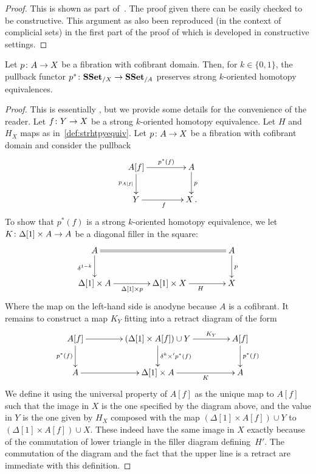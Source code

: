 \documentclass[reqno,10pt,a4paper,oneside,draft]{amsart}
\begin{document}
\begin{proof}
This is shown as part of~\cite[Theorem 3.2.3]{joyal-tierney:simplicial-homotopy-theory}. The proof given there can be easily checked to be constructive. This argument as also been reproduced (in the context of complicial sets) in the first part of the proof of \cite[Proposition~5.2.6]{henry2018wms} which is developed in constructive settings.
\end{proof}




\begin{lemma} 
\label{lemma:pb_of_StrongHomotopyEq}
Let $p \colon A \rightarrow X$ be a fibration with cofibrant domain. Then, for $k \in \{0,1\}$, 
the pullback functor $p^* \colon \mathbf{SSet}_{/X} \to \mathbf{SSet}_{/A}$ preserves strong $k$-oriented homotopy equivalences.
\end{lemma}



\begin{proof} This is essentially \cite[Lemma~3.7]{gambino2017frobenius}, but we provide some details
for the convenience of the reader.
Let $f \colon Y \rightarrow X$ be a strong $k$-oriented homotopy equivalence. Let $H$ and $H_X$  maps 
as in~\cref{def:strhtpyequiv}. Let $p \colon A \rightarrow X$ be a fibration with cofibrant domain and consider the pullback
\[
\xymatrix@C=1.5cm{
A[f] \ar[r]^-{p^*(f)}  \ar[d]_{p_{A[f]}} & A \ar[d]^{p} \\
Y \ar[r]_{f} & X \, .\\
}
\] 
To show that $p^*(f)$ is a strong $k$-oriented homotopy equivalence, we let $K \colon \Delta[1] \times A \rightarrow A$ be a diagonal filler in the square:
\[
\xymatrix@C=1.5cm{
A \ar[d]_{\delta^{1-k}} \ar@{=}[rr] & & A \ar[d]^p \\ 
\Delta[1] \times A \ar[r]_{\Delta[1] \times p}  & \Delta[1] \times X \ar[r]_H & X
}\]
Where the map on the left-hand side is anodyne because $A$ is a cofibrant.
It remains to construct a map $K_Y$  fitting into a retract diagram of the form
\[
\xymatrix@C=1.5cm{
A[f]  \ar[d]_{p^*(f)} \ar[r] &  (\Delta[1] \times A[f])  \cup Y \ar[d]^{\delta^k \times' p^*(f)} \ar[r]^-{K_Y} & A[f] \ar[d]^{p^*(f)} \\
A \ar[r] & \Delta[1]  \times A \ar[r]_-{K} & A
}
\]
We define it using the universal property of $A[f]$ as the unique map to $A[f]$ such that the image in $X$ is the one specified by the diagram above, and the value in $Y$ is the one given by $H_X$ composed with the map $(\Delta[1] \times A[f]) \cup Y$ to $(\Delta[1] \times A[f]) \cup X$. These indeed have the same image in $X$ exactly because of the commutation of lower triangle in the filler diagram defining~$H'$. The commutation of the diagram and the fact that the upper line is a retract are immediate with this definition.
\end{proof}
\end{document}
